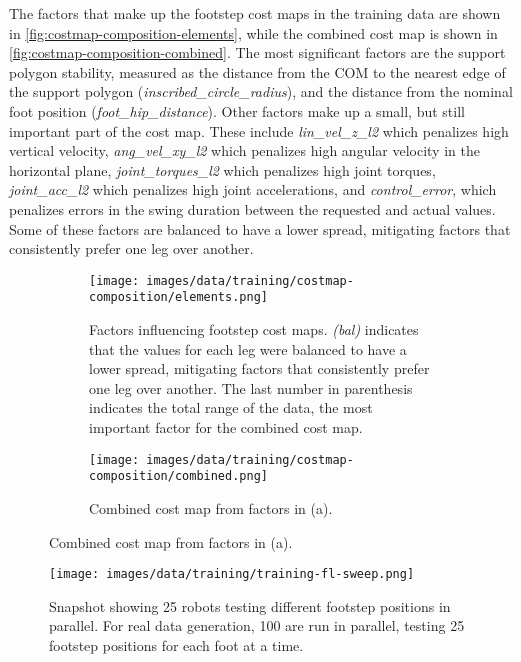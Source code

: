 The factors that make up the footstep cost maps in the training data
are shown in \autoref{fig:costmap-composition-elements}, while the
combined cost map is shown in \autoref{fig:costmap-composition-combined}.
The most significant factors are the support polygon stability,
measured as the distance from the COM to the nearest edge of the
support polygon (\textit{inscribed\_circle\_radius}), and the
distance from the nominal foot position
(\textit{foot\_hip\_distance}). Other factors make up a small, but
still important part of the cost map. These include
\textit{lin\_vel\_z\_l2} which penalizes high vertical velocity,
\textit{ang\_vel\_xy\_l2} which penalizes high angular velocity in
the horizontal plane, \textit{joint\_torques\_l2} which penalizes
high joint torques, \textit{joint\_acc\_l2} which penalizes high
joint accelerations, and \textit{control\_error}, which penalizes
errors in the swing duration between the requested and actual values.
Some of these factors are balanced to have a lower spread, mitigating
factors that consistently prefer one leg over another.

\begin{figure}
  \centering
  \begin{subfigure}[T]{0.65\textwidth}
    \centering
    \texttt{[image: images/data/training/costmap-composition/elements.png]}
    \caption{Factors influencing footstep cost maps. \textit{(bal)}
      indicates that the values for each leg were balanced to have a
      lower spread, mitigating factors that consistently prefer one leg
      over another. The last number in parenthesis indicates the total
    range of the data, the most important factor for the combined cost map.}
    \label{fig:costmap-composition-elements}
  \end{subfigure}
  \hfill
  \begin{subfigure}[T]{0.3\textwidth}
    \centering
    \texttt{[image: images/data/training/costmap-composition/combined.png]}
    \caption{Combined cost map from factors in (a).}
    \label{fig:costmap-composition-combined}
  \end{subfigure}
  \hfill
\end{figure}

\begin{figure}
  \centering
  \texttt{[image: images/data/training/training-fl-sweep.png]}
  \caption{Snapshot showing 25 robots testing different footstep
    positions in parallel. For real data generation, 100 are run in
  parallel, testing 25 footstep positions for each foot at a time.}
\end{figure}

